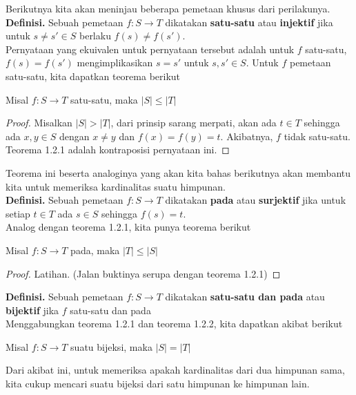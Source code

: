 	Berikutnya kita akan meninjau beberapa pemetaan khusus dari perilakunya.
	\\
	
	\textbf{Definisi. }Sebuah pemetaan $f: S \rightarrow T$ dikatakan \textbf{satu-satu} atau \textbf{injektif} jika untuk $s \ne s' \in S$ berlaku $f(s) \ne f(s')$.
	\\
	
	Pernyataan yang ekuivalen untuk pernyataan tersebut adalah untuk $f$ satu-satu, $f(s) = f(s')$ mengimplikasikan $s = s'$ untuk $s,s' \in S$. Untuk $f$ pemetaan satu-satu, kita dapatkan teorema berikut
	\begin{theorem}
		Misal $f: S \rightarrow T$ satu-satu, maka $|S| \le |T|$
	\end{theorem}
	\begin{proof}
		Misalkan $|S| > |T|$, dari prinsip sarang merpati, akan ada $t \in T$ sehingga ada $x,y \in S$ dengan $x \ne y$ dan $f(x) = f(y) = t$. Akibatnya, $f$ tidak satu-satu. Teorema 1.2.1 adalah kontraposisi pernyataan ini.
	\end{proof}
	Teorema ini beserta analoginya yang akan kita bahas berikutnya akan membantu kita untuk memeriksa kardinalitas suatu himpunan.
	\\
		
	\textbf{Definisi. }Sebuah pemetaan $f: S \rightarrow T$ dikatakan \textbf{pada} atau \textbf{surjektif} jika untuk setiap $t \in T$ ada $s \in S$ sehingga $f(s) = t$.
	\\
	
	Analog dengan teorema 1.2.1, kita punya teorema berikut
	\begin{theorem}
		Misal $f: S \rightarrow T$ pada, maka $|T| \le |S|$
	\end{theorem}
	\begin{proof}
		Latihan. (Jalan buktinya serupa dengan teorema 1.2.1)
	\end{proof}
	\textbf{Definisi. }Sebuah pemetaan $f: S \rightarrow T$ dikatakan \textbf{satu-satu dan pada} atau \textbf{bijektif} jika $f$ satu-satu dan pada
	\\
	
	Menggabungkan teorema 1.2.1 dan teorema 1.2.2, kita dapatkan akibat berikut
	\begin{corollary}
		Misal $f: S \rightarrow T$ suatu bijeksi, maka $|S| = |T|$
	\end{corollary}
	Dari akibat ini, untuk memeriksa apakah kardinalitas dari dua himpunan sama, kita cukup mencari suatu bijeksi dari satu himpunan ke himpunan lain. 
	\\
	
